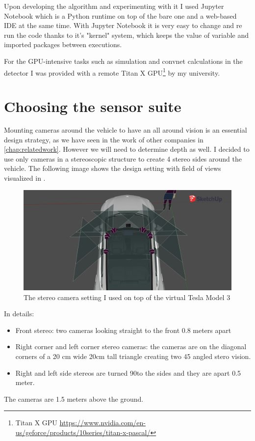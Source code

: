 Upon developing the algorithm and experimenting with it I used Jupyter Notebook
which is a Python runtime on top of the bare one and a web-based IDE at the same
time. With Jupyter Notebook it is very easy to change and re run the code thanks
to it's "kernel" system, which keeps the value of variable and imported packages
between executions.

For the GPU-intensive tasks such as simulation and convnet calculations in the
detector I was provided with a remote Titan X GPU\footnote{ Titan X GPU
    \url{https://www.nvidia.com/en-us/geforce/products/10series/titan-x-pascal/}} by
my university.

\section{Choosing the sensor suite}

Mounting cameras around the vehicle to have an all around vision is an essential
design strategy, as we have seen in the work of other companies in
\autoref{chap:relatedwork}. However we will need to determine depth as well. I
decided to use only cameras in a stereoscopic structure to create 4 stereo sides
around the vehicle. The following image shows the design setting with field of
views visualized in .

\begin{figure}[!ht]
    \centering
    \includegraphics[width=150mm, keepaspectratio]{figures/3dmodel3.png}
    \caption{The stereo camera setting I used on top of the virtual Tesla Model 3}
    \label{fig:3dmodel3}
\end{figure}

In details: 
\begin{itemize}
    \item Front stereo: two cameras looking straight to the front 0.8 meters
          apart
    \item Right corner and left corner stereo cameras: the cameras are on the
          diagonal corners of a 20 cm wide 20cm tall triangle creating two 45\degree
          angled stero vision.
    \item Right and left side stereos are turned 90\degree to the sides and they are apart 0.5 meter.
\end{itemize}
The cameras are 1.5 meters above the ground.

